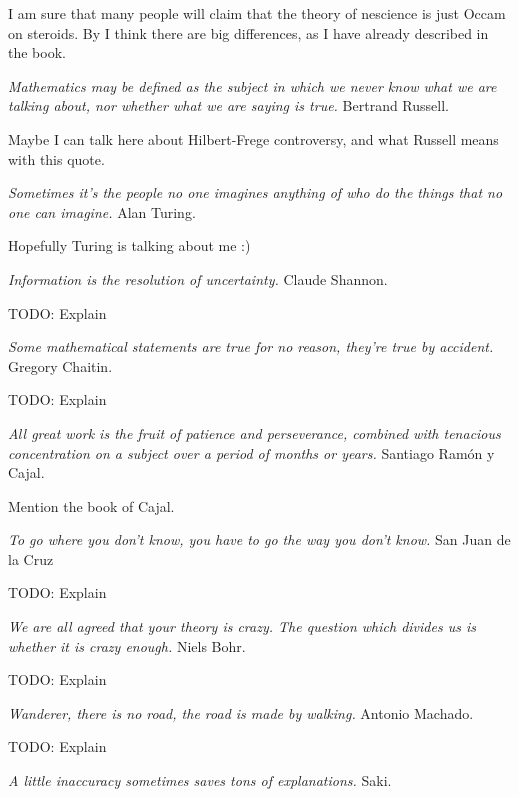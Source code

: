 {\color{red} I am sure that many people will claim that the theory of nescience is just Occam on steroids. By I think there are big differences, as I have already described in the book.}

\bigskip

\emph{Mathematics may be defined as the subject in which we never know what we are talking about, nor whether what we are saying is true.} Bertrand Russell.

{\color{red} Maybe I can talk here about Hilbert-Frege controversy, and what Russell means with this quote.}

\bigskip

\emph{Sometimes it’s the people no one imagines anything of who do the things that no one can imagine.} Alan Turing.

{\color{red} Hopefully Turing is talking about me :)}

\bigskip

\emph{Information is the resolution of uncertainty.} Claude Shannon.

{\color{red} TODO: Explain}

\bigskip

\emph{Some mathematical statements are true for no reason, they’re true by accident.} Gregory Chaitin.

{\color{red} TODO: Explain}

\bigskip

\emph{All great work is the fruit of patience and perseverance, combined with tenacious concentration on a subject over a period of months or years.} Santiago Ramón y Cajal.

{\color{red} Mention the book of Cajal.}

\bigskip

\emph{To go where you don’t know, you have to go the way you don’t know.} San Juan de la Cruz

{\color{red} TODO: Explain}

\bigskip

\emph{We are all agreed that your theory is crazy. The question which divides us is whether it is crazy enough.} Niels Bohr.

{\color{red} TODO: Explain}

\bigskip

\emph{Wanderer, there is no road, the road is made by walking.} Antonio Machado.

{\color{red} TODO: Explain}

\bigskip

\emph{A little inaccuracy sometimes saves tons of explanations.} Saki.


